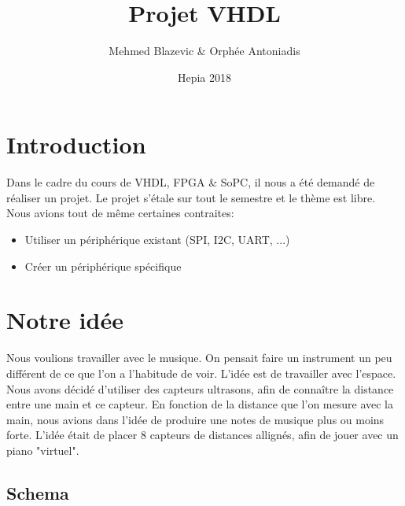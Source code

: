 \documentclass[a4paper]{article}
\title{Projet VHDL}
\author{Mehmed Blazevic \& Orphée Antoniadis}
\date{Hepia 2018}
\begin{document}
\maketitle

\section{Introduction}
Dans le cadre du cours de VHDL, FPGA \& SoPC, il nous a été demandé de réaliser un projet. 
Le projet s'étale sur tout le semestre et le thème est libre. Nous avions tout de 
même certaines contraites:

\begin{itemize}
  \item Utiliser un périphérique existant (SPI, I2C, UART, ...)
  \item Créer un périphérique spécifique
\end{itemize}

\section{Notre idée}
Nous voulions travailler avec le musique. On pensait faire un instrument un peu 
différent de ce que l'on a l'habitude de voir. L'idée est de travailler avec l'espace. 
Nous avons décidé d'utiliser des capteurs ultrasons, afin de connaître la distance 
entre une main et ce capteur. En fonction de la distance que l'on mesure avec la main, 
nous avions dans l'idée de produire une notes de musique plus ou moins forte. 
L'idée était de placer 8 capteurs de distances allignés, afin de jouer avec un piano 
"virtuel". 

\subsection{Schema}

\begin{center}
\noindent{}
\end{center}
\end{document}
